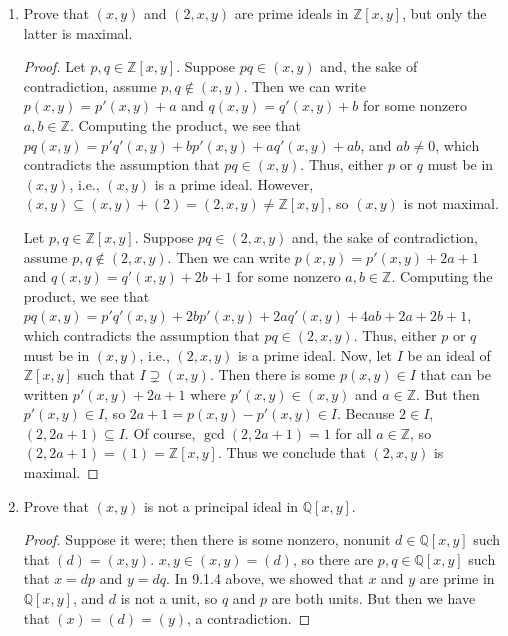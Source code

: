 \documentclass{report}
\newcommand{\Z}{\mathbb{Z}}
\newcommand{\Q}{\mathbb{Q}}
\begin{document}
\begin{enumerate}
\begin{proof}
		\noindent
		Let $p,q\in \Q[x,y]$. Suppose $pq\in(x,y)$ and, the sake of contradiction, assume $p,q\notin (x,y)$.
		Then we can write $p(x,y)=p'(x,y)+a$ and $q(x,y)=q'(x,y)+b$ for some nonzero $a,b\in \Q$.
		Computing the product, we see that $pq(x,y)=p'q'(x,y)+bp'(x,y)+aq'(x,y)+ab$, and $ab\neq 0$, which contradicts the assumption that $pq\in (x,y)$.
		Thus, either $p$ or $q$ must be in $(x,y)$, i.e., $(x,y)$ is a prime ideal. 
		Now, let $I$ be an ideal of $\Q[x,y]$ such that $I\supsetneq (x,y)$.
		Then there is some $p(x,y)\in I$ that can be written $p'(x,y)+a$ where $p'(x,y)\in (x,y)$ and $a$ is a nonzero rational.
		But then $p'(x,y)\in I$, so $a=p(x,y)-p'(x,y)\in I$ and $a$ is a unit, so $I=\Q[x,y]$.
		Thus we conclude that $(x,y)$ is maximal.
	\end{proof}
	
\item Prove that $(x,y)$ and $(2,x,y)$ are prime ideals in $\Z[x,y]$, but only the latter is maximal.
	\begin{proof}
		Let $p,q\in \Z[x,y]$. Suppose $pq\in(x,y)$ and, the sake of contradiction, assume $p,q\notin (x,y)$.
		Then we can write $p(x,y)=p'(x,y)+a$ and $q(x,y)=q'(x,y)+b$ for some nonzero $a,b\in \Z$.
		Computing the product, we see that $pq(x,y)=p'q'(x,y)+bp'(x,y)+aq'(x,y)+ab$, and $ab\neq 0$, which contradicts the assumption that $pq\in (x,y)$.
		Thus, either $p$ or $q$ must be in $(x,y)$, i.e., $(x,y)$ is a prime ideal. However, $(x,y)\subseteq (x,y)+(2)=(2,x,y)\neq \Z[x,y]$, so $(x,y)$ is not maximal.
		\bigskip

		\noindent
		Let $p,q\in \Z[x,y]$. Suppose $pq\in(2,x,y)$ and, the sake of contradiction, assume $p,q\notin (2,x,y)$.
		Then we can write $p(x,y)=p'(x,y)+2a+1$ and $q(x,y)=q'(x,y)+2b+1$ for some nonzero $a,b\in \Z$.
		Computing the product, we see that $pq(x,y)=p'q'(x,y)+2bp'(x,y)+2aq'(x,y)+4ab+2a+2b+1$, which contradicts the assumption that $pq\in (2,x,y)$.
		Thus, either $p$ or $q$ must be in $(x,y)$, i.e., $(2,x,y)$ is a prime ideal. 
		Now, let $I$ be an ideal of $\Z[x,y]$ such that $I\supsetneq (x,y)$.
		Then there is some $p(x,y)\in I$ that can be written $p'(x,y)+2a+1$ where $p'(x,y)\in (x,y)$ and $a\in\Z$.
		But then $p'(x,y)\in I$, so $2a+1=p(x,y)-p'(x,y)\in I$. Because $2\in I$, $(2,2a+1)\subseteq I$.
		Of course, $\gcd(2,2a+1)=1$ for all $a\in\Z$, so $(2,2a+1)=(1)=\Z[x,y]$. Thus we conclude that $(2,x,y)$ is maximal.

	\end{proof}
	
	\item Prove that $(x,y)$ is not a principal ideal in $\Q[x,y]$.
	\begin{proof}
		Suppose it were; then there is some nonzero, nonunit $d\in\Q[x,y]$ such that $(d)=(x,y)$. 
		$x,y\in(x,y)=(d)$, so there are $p,q\in\Q[x,y]$ such that $x=dp$ and $y=dq$. 
		In 9.1.4 above, we showed that $x$ and $y$ are prime in $\Q[x,y]$, and $d$ is not a unit, so $q$ and $p$ are both units.
		But then we have that $(x)=(d)=(y)$, a contradiction.
	\end{proof}
	

\end{enumerate}
\end{document}
